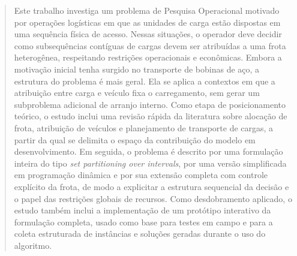 \begin{abstract}
Este trabalho investiga um problema de Pesquisa Operacional motivado por
operações logísticas em que as unidades de carga estão dispostas em uma
sequência física de acesso. Nessas situações, o operador deve decidir como
subsequências contíguas de cargas devem ser atribuídas a uma frota heterogênea,
respeitando restrições operacionais e econômicas. Embora a motivação inicial
tenha surgido no transporte de bobinas de aço, a estrutura do problema é mais
geral. Ela se aplica a contextos em que a atribuição entre carga e veículo fixa
o carregamento, sem gerar um subproblema adicional de arranjo interno. Como
etapa de posicionamento teórico, o estudo inclui uma revisão rápida da
literatura sobre alocação de frota, atribuição de veículos e planejamento de
transporte de cargas, a partir da qual se delimita o espaço da contribuição do
modelo em desenvolvimento. Em seguida, o problema é descrito por uma formulação
inteira do tipo \emph{set partitioning over intervals}, por uma versão
simplificada em programação dinâmica e por sua extensão completa com controle
explícito da frota, de modo a explicitar a estrutura sequencial da decisão e o
papel das restrições globais de recursos. Como desdobramento aplicado, o estudo
também inclui a implementação de um protótipo interativo da formulação
completa, usado como base para testes em campo e para a coleta estruturada de
instâncias e soluções geradas durante o uso do algoritmo.
\end{abstract}
